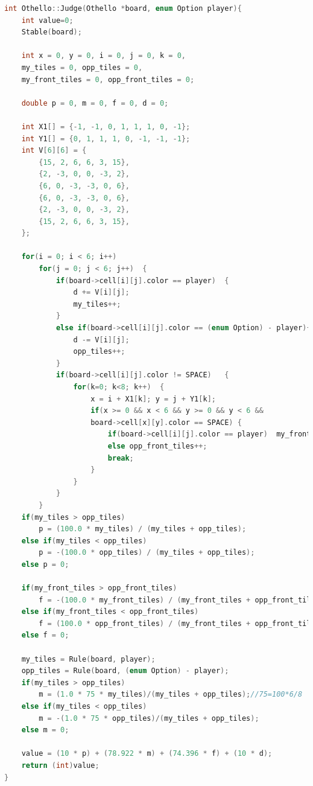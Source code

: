 \documentclass[a4paper, 11pt]{article}
\begin{document}
\begin{lstlisting}[language=C++]
int Othello::Judge(Othello *board, enum Option player){
    int value=0;
    Stable(board);
		
    int x = 0, y = 0, i = 0, j = 0, k = 0,
    my_tiles = 0, opp_tiles = 0, 
    my_front_tiles = 0, opp_front_tiles = 0;
		
    double p = 0, m = 0, f = 0, d = 0;
		
    int X1[] = {-1, -1, 0, 1, 1, 1, 0, -1};
    int Y1[] = {0, 1, 1, 1, 0, -1, -1, -1};
    int V[6][6] = {
        {15, 2, 6, 6, 3, 15},
        {2, -3, 0, 0, -3, 2},
        {6, 0, -3, -3, 0, 6},
        {6, 0, -3, -3, 0, 6},
        {2, -3, 0, 0, -3, 2},
        {15, 2, 6, 6, 3, 15},
    };

    for(i = 0; i < 6; i++)
        for(j = 0; j < 6; j++)  {
            if(board->cell[i][j].color == player)  {
                d += V[i][j];
                my_tiles++;
            } 
            else if(board->cell[i][j].color == (enum Option) - player){
                d -= V[i][j];
                opp_tiles++;
            }
            if(board->cell[i][j].color != SPACE)   {
                for(k=0; k<8; k++)  {
                    x = i + X1[k]; y = j + Y1[k];
                    if(x >= 0 && x < 6 && y >= 0 && y < 6 &&
                    board->cell[x][y].color == SPACE) {
                        if(board->cell[i][j].color == player)  my_front_tiles++;
                        else opp_front_tiles++;
                        break;
                    }
                }
            }
        }
    if(my_tiles > opp_tiles)
        p = (100.0 * my_tiles) / (my_tiles + opp_tiles);
    else if(my_tiles < opp_tiles)
        p = -(100.0 * opp_tiles) / (my_tiles + opp_tiles);
    else p = 0;
		
    if(my_front_tiles > opp_front_tiles)
        f = -(100.0 * my_front_tiles) / (my_front_tiles + opp_front_tiles);
    else if(my_front_tiles < opp_front_tiles)
        f = (100.0 * opp_front_tiles) / (my_front_tiles + opp_front_tiles);
    else f = 0;
		
    my_tiles = Rule(board, player);
    opp_tiles = Rule(board, (enum Option) - player);
    if(my_tiles > opp_tiles)
        m = (1.0 * 75 * my_tiles)/(my_tiles + opp_tiles);//75=100*6/8
    else if(my_tiles < opp_tiles)
        m = -(1.0 * 75 * opp_tiles)/(my_tiles + opp_tiles);
    else m = 0;
		
    value = (10 * p) + (78.922 * m) + (74.396 * f) + (10 * d);
    return (int)value;
}
\end{lstlisting}
\end{document}
